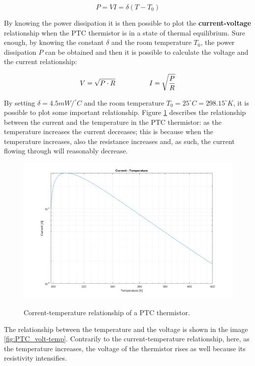 \begin{equation*}
    P = VI = \delta(T - T_0)
\end{equation*}

\noindent By knowing the power dissipation it is then possible to plot the \textbf{current-voltage} relationship when the PTC thermistor is in a state of thermal equilibrium. Sure enough, by knowing the constant $\delta$ and the room temperature $T_0$, the power dissipation $P$ can be obtained and then it is possible to calculate the voltage and the current relationship:

\begin{equation*}
    V = \sqrt{P \cdot R} \hspace{50px} I = \sqrt{\frac{P}{R}}
\end{equation*}

\noindent By setting $\delta = 4.5 mW/^{\circ}C$ and the room temperature $T_0 = 25^{\circ}C = 298.15^{\circ} K$, it is possible to plot some important relationship. Figure \ref{fig:PTC_curr-temp} describes the relationship between the current and the temperature in the PTC thermistor: as the temperature increases the current decreases; this is because when the temperature increases, also the resistance increases and, as such, the current flowing through will reasonably decrease.

\begin{figure}[h]
    \centering
    \includegraphics[width = .7\textwidth]{../res/plots/PTC_curr-temp.png}
    \label{fig:PTC_curr-temp}
    \caption{Corrent-temperature relationship of a PTC thermistor.}
\end{figure}

\FloatBarrier \noindent The relationship between the temperature and the voltage is shown in the image \ref{fig:PTC_volt-temp}. Contrarily to the current-temperature relationship, here, as the temperature increases, the voltage of the thermistor rises as well because its resistivity intensifies.

